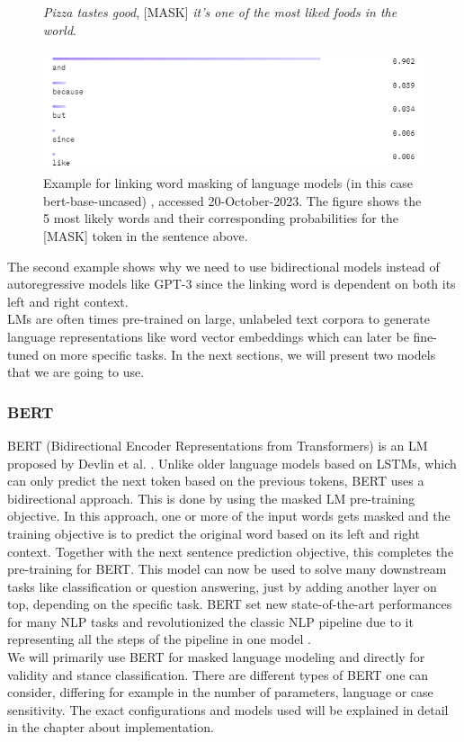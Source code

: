 \begin{figure}[H]
  \begin{center}
	\textit{Pizza tastes good}, [MASK] \textit{it's one of the most liked foods in the world}.
  \end{center}
  \centering
  \includegraphics[scale=0.9]{fig/bert_masking_example2.png}
  \caption{Example for linking word masking of language models (in this case bert-base-uncased) \cite{bertbaseuncased}, accessed 20-October-2023. The figure shows the 5 most likely words and their corresponding probabilities for the [MASK] token in the sentence above.}%
  \label{fig:bert_masking_example2}
\end{figure}

The second example shows why we need to use bidirectional models instead of autoregressive models like GPT-3 since the linking word is dependent on both its left and right context. \\
LMs are often times pre-trained on large, unlabeled text corpora to generate language representations like word vector embeddings which can later be fine-tuned on more specific tasks. In the next sections, we will present two models that we are going to use.


\subsubsection{BERT}
BERT (Bidirectional Encoder Representations from Transformers) is an LM proposed by Devlin et al. \cite{bert}. Unlike older language models based on LSTMs, which can only predict the next token based on the previous tokens, BERT uses a bidirectional approach. This is done by using the masked LM pre-training objective. In this approach, one or more of the input words gets masked and the training objective is to predict the original word based on its left and right context. Together with the next sentence prediction objective, this completes the pre-training for BERT. This model can now be used to solve many downstream tasks like classification or question answering, just by adding another layer on top, depending on the specific task. BERT set new state-of-the-art performances for many NLP tasks and revolutionized the classic NLP pipeline due to it representing all the steps of the pipeline in one model \cite{bertexplain}.  \\
We will primarily use BERT for masked language modeling and directly for validity and stance classification. There are different types of BERT one can consider, differing for example in the number of parameters, language or case sensitivity. The exact configurations and models used will be explained in detail in the chapter about implementation. \\

